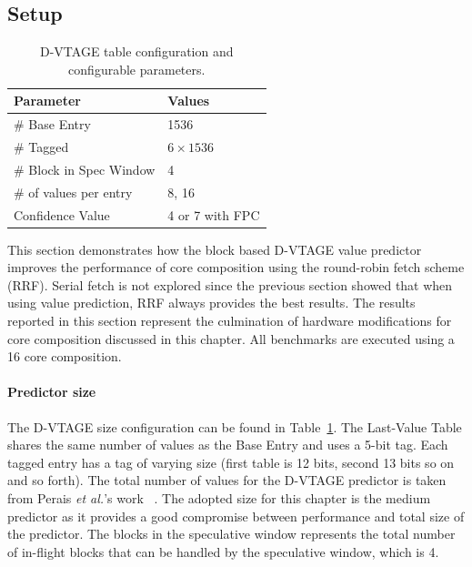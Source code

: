 \vspace{-1em}
\subsection{Setup}

\begin{table}[t]
\smaller
\centering
\begin{tabular}{p{5.2cm} p{3cm}}
\toprule
\textbf{Parameter} & \textbf{Values} \\ \midrule
\# Base Entry & 1536\\
\# Tagged & $6\times1536$\\
\# Block in Spec Window & 4 \\ \hline \midrule
\# of values per entry & 8, 16\\
Confidence Value & 4 or 7 with FPC \\ \bottomrule
\end{tabular}
  \caption{D-VTAGE table configuration and configurable parameters.}\label{tab:vtage-conf}
\vspace{1em}
\end{table}

This section demonstrates how the block based D-VTAGE value predictor improves the performance of core composition using the round-robin fetch scheme (RRF).
Serial fetch is not explored since the previous section showed that when using value prediction, RRF always provides the best results.
The results reported in this section represent the culmination of hardware modifications for core composition discussed in this chapter.
All benchmarks are executed using a 16 core composition.

\paragraph*{Predictor size}
The D-VTAGE size configuration can be found in Table~\ref{tab:vtage-conf}.
The Last-Value Table shares the same number of values as the Base Entry and uses a 5-bit tag.
Each tagged entry has a tag of varying size (first table is 12 bits, second 13 bits so on and so forth).
The total number of values for the D-VTAGE predictor is taken from Perais {\it et al.}'s work ~\cite{peraisBeBop2015}.
The adopted size for this chapter is the medium predictor as it provides a good compromise between performance and total size of the predictor.
The blocks in the speculative window represents the total number of in-flight blocks that can be handled by the speculative window, which is 4.

